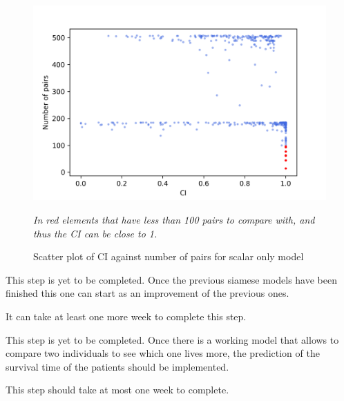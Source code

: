 \begin{figure}
  \centering
  \includegraphics[width=.8\textwidth]{images/results/scatter_scalar}
  \caption{Scatter plot of \acrshort{CI} against number of pairs for scalar only model
  \label{fig:scatter-scalar-CI}
  }

  \itshape\justify
  In red elements that have less than 100 pairs to compare with, and thus the \acrshort{CI} 
  can be close to 1.
\end{figure}


This step is yet to be completed. Once the previous siamese models have been finished this
one can start as an improvement of the previous ones.

It can take at least one more week to complete this step.


This step is yet to be completed. Once there is a working model that allows to compare two 
individuals to see which one lives more, the prediction of the survival time of the patients 
should be implemented.

This step should take at most one week to complete.

